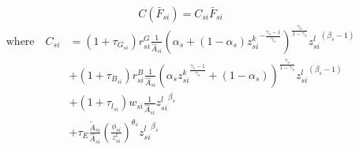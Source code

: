 \begin{equation*}
	C(\bar{F}_{si}) = C_{si} \bar{F}_{si} 
	\end{equation*}
	\begin{equation*}
		\begin{split}
			\text{where} \quad C_{si}  &  = (1+ \tau_{G_{si}}) r^{G}_{si} \frac{1}{\hat{A}_{si}}\left(
				\alpha_s  + (1-\alpha_s){z^k_{si}}^{-\frac{\gamma_s-1}{\gamma_s}}
				\right)^{\frac{\gamma_s}{1-\gamma_s}} {z_{si}^l}^{(\beta_s-1)}\\
			& + (1+ \tau_{B_{si}})r^{B}_{si}\frac{1}{\hat{A}_{si}} \left(\alpha_s {z^k_{si}}^{\frac{\gamma_s -1}{\gamma_s}} + (1-\alpha_s)
			\right)^{\frac{\gamma_s}{1-\gamma_s}} {z_{si}^l}^{(\beta_s-1)}\\
			& + (1+ \tau_{l_{si}}) w_{si} \frac{1}{\hat{A}_{si}}  {z_{si}^l}^{\beta_s}\\
			 & + \tau_{E} \frac{\tilde{A}_{si}}{\hat{A}_{si}}(\frac{\phi_{si}}{z^{l}_{si}})^{\theta_s} {z^{l}_{si}}^{\beta_s}
		\end{split}
	\end{equation*}